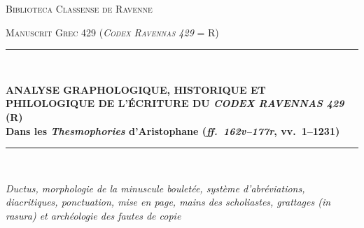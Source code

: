\documentclass[11pt, a4paper, twoside]{article}
\renewcommand{\_}{\origunderscore\penalty0\relax}
\renewcommand{\texttt}[1]{#1}
\newcommand{\R}{\textbf{R}}
\def\R{R}%
\begin{document}
\begin{titlepage}
\centering
\vspace*{1.0cm}
{\scshape\Large Biblioteca Classense de Ravenne \par}
\vspace{0.4cm}
{\scshape\large Manuscrit Grec 429 (\textit{Codex Ravennas 429} = \R{}) \par}
\vspace{1.2cm}
\rule{\textwidth}{1.5pt}\\[0.5cm]
{\huge\bfseries\color{RavennasRed} ANALYSE GRAPHOLOGIQUE, HISTORIQUE ET PHILOLOGIQUE DE L'ÉCRITURE DU \textit{CODEX RAVENNAS 429} (\R{})\\[0.3cm]
\Large Dans les \textit{Thesmophories} d'Aristophane (\textit{ff.\ 162v--177r}, vv.\ 1--1231)\par}
\vspace{0.3cm}
\rule{\textwidth}{1.5pt}\\[0.8cm]

{\large\itshape Ductus, morphologie de la minuscule bouletée, système d'abréviations, diacritiques, ponctuation, mise en page, mains des scholiastes, grattages (\texttt{in rasura}) et archéologie des fautes de copie\par}


\end{titlepage}
\end{document}
